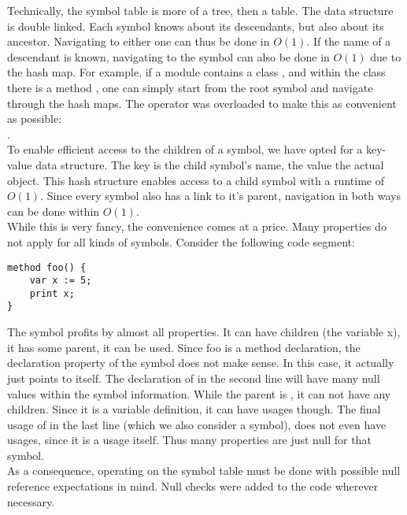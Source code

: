 Technically, the symbol table is more of a tree, then a table.
The data structure is double linked.
Each symbol knows about its descendants, but also about its ancestor.
Navigating to either one can thus be done in $O(1)$.
If the name of a descendant is known, navigating to the symbol can also be done in $O(1)$ due to the hash map.
For example, if a module  contains a class , and within the class there is a method , one can simply start from the root symbol and navigate through the hash maps.
The \code{[]} operator was overloaded to make this as convenient as possible:\\
.\\

To enable efficient access to the children of a symbol, we have opted for a key-value data structure.
The key is the child symbol's name, the value the actual  object.
This hash structure enables access to a child symbol with a runtime of $O(1)$.
Since every symbol also has a link to it's parent, navigation in both ways can be done within $O(1)$.\\

While this is very fancy, the convenience comes at a price.
Many properties do not apply for all kinds of symbols.
Consider the following code segment:

\begin{lstlisting}[language=dafny, caption={Example Code Regarding Symbol Information}, captionpos=b, label={lst:aldbkajds}]
method foo() {
    var x := 5;
    print x;
}
\end{lstlisting}

The symbol  profits by almost all properties.
It can have children (the variable x), it has some parent, it can be used.
Since foo is a method declaration, the declaration property of the symbol does not make sense.
In this case, it actually just points to itself.
The declaration of  in the second line will have many null values within the symbol information.
While the parent is , it can not have any children.
Since it is a variable definition, it can have usages though.
The final usage of  in the last line (which we also consider a symbol), does not even have usages, since it is a usage itself.
Thus many properties are just null for that symbol.\\

As a consequence, operating on the symbol table must be done with possible null reference expectations in mind.
Null checks were added to the code wherever necessary.\\

